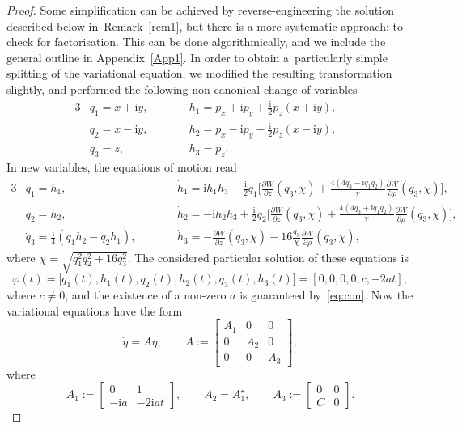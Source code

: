\documentclass[pdftex]{sigma}
\numberwithin{equation}{section}
\begin{document}
\begin{proof}
 Some simplification can be achieved by reverse-engineering the solution described below in~Remark~\ref{rem1}, but there is a more systematic approach: to check for factorisation. This can be done algorithmically, and we include the general outline in Appendix~\ref{App1}. In order to obtain a~particularly simple splitting of the variational equation, we modified the resulting transformation slightly, and performed the
 following non-canonical change of variables
 \begin{alignat}{3}
& q_1 = x +\mathrm{i}y, \qquad &&h_1=p_x+\mathrm{i}p_y + \frac{\mathrm{i}}{2}p_{z}( x +\mathrm{i}y),& \nonumber
 \\
& q_2 = x -\mathrm{i}y, \qquad &&h_2=p_x-\mathrm{i}p_y - \frac{\mathrm{i}}{2}p_{z}( x -\mathrm{i}y),&\nonumber
 \\
& q_3= z, \qquad &&h_3 = p_z.&\label{eq:1}
 \end{alignat}
 In new variables, the equations of motion read
 \begin{alignat*}{3}
 &\dot q_1 = h_1, \qquad&&
 \dot h_1 = \mathrm{i} h_1h_3
 -\frac{\mathrm{i}}{2}q_1\bigg[ \frac{\partial W}{\partial
 z}(q_3, \chi) + \frac{4(4q_3 -\mathrm{i}q_1q_2 )}{\chi}
 \frac{\partial W}{\partial \rho}(q_3, \chi) \bigg],&
 \\
 &\dot q_2 = h_2, \qquad&&
 \dot h_2 = -\mathrm{i} h_2 h_3 +
 \frac{\mathrm{i}}{2}q_2\bigg[ \frac{\partial W}{\partial z}(q_3,
 \chi) + \frac{4(4q_3 +\mathrm{i}q_1q_2) }{\chi}
 \frac{\partial W}{\partial \rho}(q_3, \chi) \bigg],&
 \\
 &\dot q_3 =\frac{\mathrm{i}}{4}(q_1h_2-q_2h_1), \qquad&&
 \dot h_3=
 -\frac{\partial W}{\partial z}(q_3, \chi) - 16\frac{q_3}{\chi}
 \frac{\partial W}{\partial \rho}(q_3, \chi) ,&
 \end{alignat*}
 where $\chi=\sqrt{q_1^2q_2^2 +16q_3^{2}}$. The
 considered particular solution of these equations is
 \begin{equation*}
 \varphi(t) = \big[q_1(t),h_1(t),q_2(t),h_2(t), q_3(t),h_3(t)\big] =
 [0, 0,0,0, c, -2 a t ],
 \end{equation*}
 where $c\neq 0$, and the existence of a non-zero $a$ is guaranteed by~\eqref{eq:con}. Now the
 variational equations have the form
 \begin{equation}
 \label{eq:3}
 \dot \eta = A \eta, \qquad
 A:=\begin{bmatrix}
 A_1 & 0 & 0 \\
 0 & A_2 & 0\\
 0 & 0 & A_3
 \end{bmatrix}\!,
 \end{equation}
 where
 \begin{equation*} %
 A_1:=\begin{bmatrix}
 0 & 1 \\
 -\mathrm{i}a & -2 \mathrm{i}a t
 \end{bmatrix}\! , \qquad
 A_2 = A_1^{\star}, \qquad
 A_3:=\begin{bmatrix}
 0 & 0 \\
 C & 0
 \end{bmatrix}\! .
 \end{equation*}



\end{proof}
\end{document}
